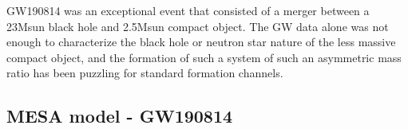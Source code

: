 \documentclass[linenumbers,trackchanges,twocolumn]{aastex701}
\newcommand{\red}{\textcolor{red}}
\begin{document}
GW190814 was an exceptional event that consisted of a merger between a 23Msun black hole and 2.5Msun compact object. The GW data alone was not enough to characterize the black hole or neutron star nature of the less massive compact object, and the formation of such a system of such an asymmetric mass ratio has been puzzling for standard formation channels. 

\subsection{MESA model - GW190814}

\end{document}
